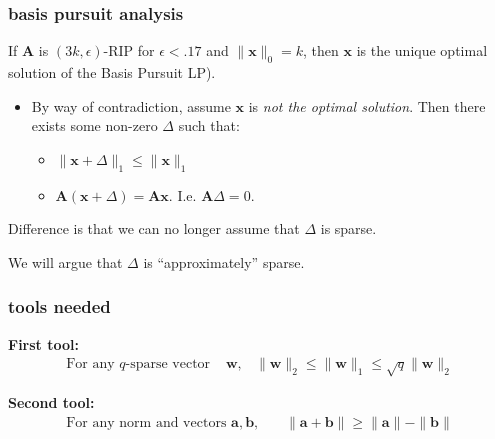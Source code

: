 \documentclass[compress]{beamer}
\newcommand{\bv}[1]{\mathbf{#1}}
\begin{document}
	\begin{frame}[t]
		\frametitle{basis pursuit analysis}
		\begin{theorem}
			If $\bv{A}$ is $(3k, \epsilon)$-RIP for $\epsilon < .17$ and $\|\bv{x}\|_0 = k$, then $\bv{x}$ is the unique optimal solution of the Basis Pursuit LP).
		\end{theorem}
		\begin{itemize}
			\item By way of contradiction, assume $\bv{x}$ is \emph{not the optimal solution}. Then there exists some non-zero ${\Delta}$ such that:
			\begin{itemize}
				\item $\|\bv{x} + {\Delta}\|_1 \leq \|\bv{x}\|_1$
				\item $\bv{A}(\bv{x} + {\Delta}) = \bv{A}\bv{x}$. I.e. $\bv{A}{\Delta} = 0$.
			\end{itemize}
		\end{itemize}
		Difference is that we can no longer assume that $\Delta$ is sparse. 
		
		\begin{center}
			\alert{We will argue that $\Delta$ is ``approximately'' sparse.} 
		\end{center}
	\end{frame}
	
	\begin{frame}[t]
		\frametitle{tools needed}		
		\textbf{First tool:}
		\begin{align*}
			\text{For any $q$-sparse vector } &\bv{w}, & \|\bv{w} \|_2 \leq \|\bv{w} \|_1 \leq \sqrt{q}\|\bv{w}\|_2
		\end{align*}
		\vspace{3em}
		
		\textbf{Second tool:}
		\begin{align*}
			\text{For any norm and vectors $\bv{a},\bv{b}$, }& & \|\bv{a}+ \bv{b}\| \geq \|\bv{a}\| - \|\bv{b}\|
		\end{align*}
		
		
	\end{frame}
	
\end{document}
